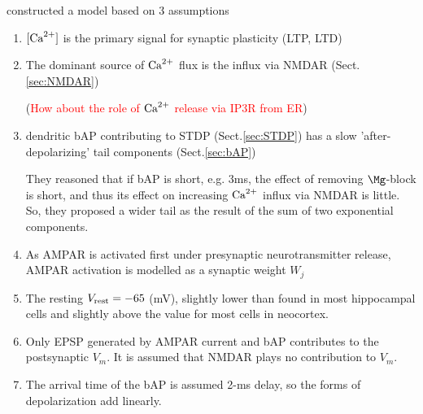 \citep{shouval2002} constructed a model 
based on 3 assumptions
\begin{enumerate}
  \item $[{\text{Ca}^{2+}}]$ is the primary signal for synaptic plasticity (LTP, LTD)
  
  \item The dominant source of ${\text{Ca}^{2+}}$ flux is the influx via NMDAR
  (Sect.\ref{sec:NMDAR}) 
  
  (\textcolor{red}{How about the role of ${\text{Ca}^{2+}}$ release via IP3R from ER})
  
  \item dendritic bAP contributing to STDP (Sect.\ref{sec:STDP}) has a slow
  'after-depolarizing' tail components (Sect.\ref{sec:bAP})
  
  They reasoned that if bAP is short, e.g. 3ms, the effect of removing
  $\Mg$-block is short, and thus its effect on increasing ${\text{Ca}^{2+}}$ influx via NMDAR
  is little. So, they proposed a wider tail as the result of the sum of two
  exponential components.
  
  
  \item As AMPAR is activated first under presynaptic neurotransmitter
  release, AMPAR activation is modelled as a synaptic weight $W_j$
  
  \item The resting $V_{\text{rest}} = -65$ (mV), slightly lower than found in most
  hippocampal cells and slightly above the value for most cells in neocortex.
  
  \item Only EPSP generated by AMPAR current and bAP contributes to the
  postsynaptic $V_m$. It is assumed that NMDAR plays no contribution to $V_m$.
  
  
  \item The arrival time of the bAP is assumed 2-ms delay, so the forms of
  depolarization add linearly. 
    
\end{enumerate}

%   
%   



